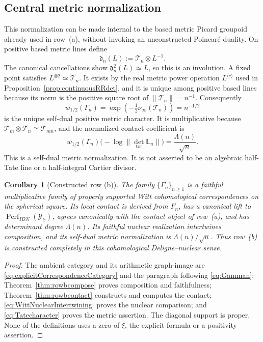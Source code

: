 \documentclass[11pt]{amsart}
\newtheorem{corollary}[theorem]{Corollary}
\theoremstyle{definition}
\theoremstyle{remark}
\begin{document}
\subsection{Central metric normalization}

This normalization can be made internal to the based metric Picard
groupoid already used in row~(a), without invoking an unconstructed
Poincar\'e duality.  On positive based metric lines define
\[
 \mathfrak d_n(L):=\mathcal T_n\otimes L^{-1}.
\]
The canonical cancellations show
$\mathfrak d_n^2(L)\simeq L$, so this is an involution.  A fixed point
satisfies $L^{\otimes2}\simeq\mathcal T_n$.  It exists by the real metric
power operation $L^{\langle c\rangle}$ used in
Proposition~\ref{prop:continuousRRdet}, and it is unique among positive
based lines because its norm is the positive square root of
$\|\mathcal T_n\|=n^{-1}$.  Consequently
\begin{equation}\label{eq:Tatecharacter}
 w_{1/2}(\Gamma_n)=
 \exp\!\left(-\tfrac12\nu_\infty(\mathcal T_n)\right)=n^{-1/2}
\end{equation}
is the unique self-dual positive metric character.  It is multiplicative
because $\mathcal T_m\otimes\mathcal T_n\simeq\mathcal T_{mn}$, and the
normalized contact coefficient is
\begin{equation}\label{eq:centralLocalCoefficient}
 w_{1/2}(\Gamma_n)
 \bigl(-\log\|\det_{\mathrm{tor}}\mathbb L_n\|\bigr)
 =\frac{\Lambda(n)}{\sqrt n}.
\end{equation}
This is a self-dual metric normalization.  It is not asserted to be an
algebraic half-Tate line or a half-integral Cartier divisor.

\begin{corollary}[Constructed row (b)]\label{cor:rowb}
The family $\{\Gamma_n\}_{n\geq1}$ is a faithful multiplicative family of
properly supported Witt cohomological correspondences on the spherical
square.  Its local contact is derived from $F_n$, has a canonical lift to
$\operatorname{Perf}_{IDN}(\mathscr Y_{\mathbb S})$, agrees canonically
with the contact object of row~(a), and has determinant degree
$\Lambda(n)$.  Its faithful nuclear realization intertwines composition,
and its self-dual metric normalization is $\Lambda(n)/\sqrt n$.  Thus
row~(b) is constructed completely in this cohomological
Deligne--nuclear sense.
\end{corollary}

\begin{proof}
The ambient category and its arithmetic graph-image are
\eqref{eq:explicitCorrespondenceCategory} and the paragraph following
\eqref{eq:Gamman};
Theorem~\ref{thm:rowbcompose} proves composition and faithfulness;
Theorem~\ref{thm:rowbcontact} constructs and computes the contact;
\eqref{eq:WittNuclearIntertwining} proves the nuclear comparison; and
\eqref{eq:Tatecharacter} proves the metric assertion.  The diagonal support
is proper.  None of the definitions uses a zero of $\xi$, the explicit
formula or a positivity assertion.
\end{proof}
\end{document}
